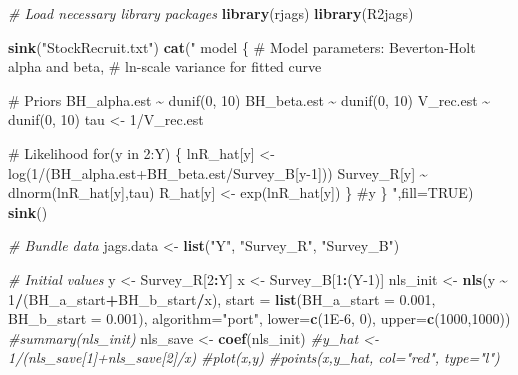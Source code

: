\documentclass[
]{krantz}
\makeatletter
\newenvironment{Shaded}{\begin{snugshade}}{\end{snugshade}}
\newcommand{\AttributeTok}[1]{\textcolor[rgb]{0.27,0.27,0.27}{#1}}
\newcommand{\CommentTok}[1]{\textcolor[rgb]{0.37,0.37,0.37}{\textit{#1}}}
\newcommand{\ConstantTok}[1]{\textcolor[rgb]{0.37,0.37,0.37}{#1}}
\newcommand{\DecValTok}[1]{\textcolor[rgb]{0.06,0.06,0.06}{#1}}
\newcommand{\FloatTok}[1]{\textcolor[rgb]{0.06,0.06,0.06}{#1}}
\newcommand{\FunctionTok}[1]{\textcolor[rgb]{0.27,0.27,0.27}{\textbf{#1}}}
\newcommand{\NormalTok}[1]{#1}
\newcommand{\OtherTok}[1]{\textcolor[rgb]{0.37,0.37,0.37}{#1}}
\newcommand{\SpecialCharTok}[1]{\textcolor[rgb]{0.43,0.43,0.43}{\textbf{#1}}}
\newcommand{\StringTok}[1]{\textcolor[rgb]{0.5,0.5,0.5}{#1}}
\newenvironment{kframe}{%
\medskip{}
\setlength{\fboxsep}{.8em}
 \def\at@end@of@kframe{}%
 \ifinner\ifhmode%
  \def\at@end@of@kframe{\end{minipage}}%
  \begin{minipage}{\columnwidth}%
 \fi\fi%
 \def\FrameCommand##1{\hskip\@totalleftmargin \hskip-\fboxsep
 \colorbox{shadecolor}{##1}\hskip-\fboxsep
     \hskip-\linewidth \hskip-\@totalleftmargin \hskip\columnwidth}%
 \MakeFramed {\advance\hsize-\width
   \@totalleftmargin\z@ \linewidth\hsize
   \@setminipage}}%
 {\par\unskip\endMakeFramed%
 \at@end@of@kframe}
\renewenvironment{Shaded}{\begin{kframe}}{\end{kframe}}
\makeatother
\begin{document}
\begin{Shaded}
\begin{Highlighting}[]
\CommentTok{\# Load necessary library packages}
\FunctionTok{library}\NormalTok{(rjags)}
\FunctionTok{library}\NormalTok{(R2jags)}

\FunctionTok{sink}\NormalTok{(}\StringTok{"StockRecruit.txt"}\NormalTok{)}
\FunctionTok{cat}\NormalTok{(}\StringTok{"}
\StringTok{model \{}
\StringTok{\# Model parameters: Beverton{-}Holt alpha and beta, }
\StringTok{\# ln{-}scale variance for fitted curve}

\StringTok{\# Priors}
\StringTok{ BH\_alpha.est \textasciitilde{} dunif(0, 10)}
\StringTok{ BH\_beta.est \textasciitilde{} dunif(0, 10)}
\StringTok{ V\_rec.est \textasciitilde{} dunif(0, 10)}
\StringTok{ tau \textless{}{-} 1/V\_rec.est}

\StringTok{\# Likelihood}
\StringTok{    for(y in 2:Y) \{}
\StringTok{      lnR\_hat[y] \textless{}{-} log(1/(BH\_alpha.est+BH\_beta.est/Survey\_B[y{-}1]))}
\StringTok{      Survey\_R[y] \textasciitilde{} dlnorm(lnR\_hat[y],tau)}
\StringTok{      R\_hat[y] \textless{}{-} exp(lnR\_hat[y])}
\StringTok{      \} \#y}
\StringTok{\}}
\StringTok{    "}\NormalTok{,}\AttributeTok{fill=}\ConstantTok{TRUE}\NormalTok{)}
\FunctionTok{sink}\NormalTok{()}

\CommentTok{\# Bundle data}
\NormalTok{jags.data }\OtherTok{\textless{}{-}} \FunctionTok{list}\NormalTok{(}\StringTok{"Y"}\NormalTok{, }\StringTok{"Survey\_R"}\NormalTok{, }\StringTok{"Survey\_B"}\NormalTok{)}

\CommentTok{\# Initial values}
\NormalTok{y }\OtherTok{\textless{}{-}}\NormalTok{ Survey\_R[}\DecValTok{2}\SpecialCharTok{:}\NormalTok{Y]}
\NormalTok{x }\OtherTok{\textless{}{-}}\NormalTok{ Survey\_B[}\DecValTok{1}\SpecialCharTok{:}\NormalTok{(Y}\DecValTok{{-}1}\NormalTok{)]}
\NormalTok{nls\_init }\OtherTok{\textless{}{-}} \FunctionTok{nls}\NormalTok{(y }\SpecialCharTok{\textasciitilde{}} \DecValTok{1}\SpecialCharTok{/}\NormalTok{(BH\_a\_start}\SpecialCharTok{+}\NormalTok{BH\_b\_start}\SpecialCharTok{/}\NormalTok{x),}
                \AttributeTok{start =} \FunctionTok{list}\NormalTok{(}\AttributeTok{BH\_a\_start =} \FloatTok{0.001}\NormalTok{, }\AttributeTok{BH\_b\_start =} \FloatTok{0.001}\NormalTok{),}
                \AttributeTok{algorithm=}\StringTok{"port"}\NormalTok{, }
                \AttributeTok{lower=}\FunctionTok{c}\NormalTok{(}\FloatTok{1E{-}6}\NormalTok{, }\DecValTok{0}\NormalTok{), }\AttributeTok{upper=}\FunctionTok{c}\NormalTok{(}\DecValTok{1000}\NormalTok{,}\DecValTok{1000}\NormalTok{))}
\CommentTok{\#summary(nls\_init)}
\NormalTok{nls\_save }\OtherTok{\textless{}{-}} \FunctionTok{coef}\NormalTok{(nls\_init)}
\CommentTok{\#y\_hat \textless{}{-} 1/(nls\_save[1]+nls\_save[2]/x)}
\CommentTok{\#plot(x,y)}
\CommentTok{\#points(x,y\_hat, col="red", type="l")}


\end{Highlighting}
\end{Shaded}
\end{document}
